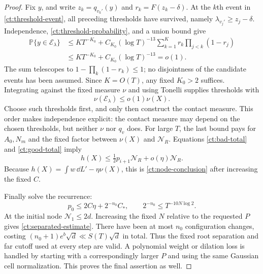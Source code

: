 \begin{proof}
Fix $y$, and write $z_k=q_{v_k'}(y)$ and $r_k=F(z_k-\delta)$.
At the $k$th event in \eqref{ct:threshold-event}, all preceding
thresholds have survived, namely $\lambda_{v_j'}\ge z_j-\delta$.
Independence, \eqref{ct:threshold-probability}, and a union bound give
\begin{align*}
 \mathbb P\{y\in\mathcal E_\lambda\}
 &\le KT^{-K_0}
  +C_{K_0}(\log T)^{-13}
       \sum_{k=1}^K r_k\prod_{j<k}(1-r_j)\\
 &\le KT^{-K_0}+C_{K_0}(\log T)^{-13}=o(1).
\end{align*}
The sum telescopes to $1-\prod_k(1-r_k)\le1$; no disjointness of
the candidate events has been assumed.  Since $K=O(T)$, any fixed
$K_0>2$ suffices.  Integrating against the fixed measure $\nu$ and
using Tonelli supplies thresholds with
\[
 \nu(\mathcal E_\lambda)\le o(1)\nu(X).
\]
Choose such thresholds first, and only then construct the contact
measure.  This order makes independence explicit: the contact measure
may depend on the chosen thresholds, but neither $\nu$ nor $q_v$ does.
For large $T$, the last bound pays for $A_0,N_m$ and the fixed factor
between $\nu(X)$ and $\mathcal N_R$.  Equations
\eqref{ct:bad-total} and \eqref{ct:good-total} imply
\[
 h(X)\le\tfrac12p_{i+1}\mathcal N_R+o(\eta)\mathcal N_R.
\]
Because $h(X)=\int w\,\dd L'-\eta\nu(X)$, this is
\eqref{ct:node-conclusion} after increasing the fixed $C$.

Finally solve the recurrence:
\[
 p_0\le2C\eta+2^{-n_0}C_*,\qquad
 2^{-n_0}\le T^{-10N\log2}.
\]
At the initial node $\mathcal N_1\le2d$.  Increasing the fixed $N$
relative to the requested $P$ gives \eqref{ct:separated-estimate}.
There have been at most $n_0$ configuration changes, costing
$(n_0+1)e^b\sqrt d\ll S(T)\sqrt d$ in total.  Thus the fixed root
separation and far cutoff used at every step are valid.  A polynomial
weight or dilation loss is handled by starting with a correspondingly
larger $P$ and using the same Gaussian cell normalization.  This proves
the final assertion as well.
\end{proof}
